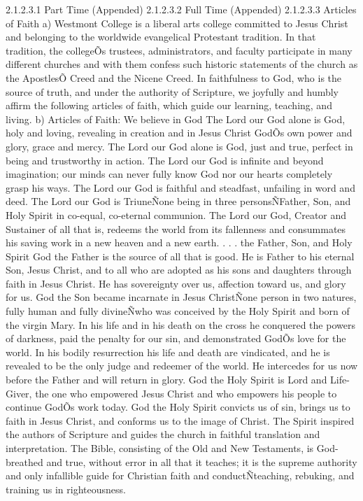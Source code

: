 \documentclass[letterpaper, 11pt]{article}
\begin{document}
				2.1.2.3.1 Part Time (Appended)
				2.1.2.3.2 Full Time (Appended)
				2.1.2.3.3 Articles of Faith
				a) Westmont College is a liberal arts college committed to Jesus Christ and belonging to the worldwide evangelical Protestant tradition.  In that tradition, the collegeÕs trustees, administrators, and faculty participate in many different churches and with them confess such historic statements of the church as the ApostlesÕ Creed and the Nicene Creed. In faithfulness to God, who is the source of truth, and under the authority of Scripture, we joyfully and humbly affirm the following articles of faith, which guide our learning, teaching, and living.
				b) Articles of Faith:
				We believe in God
				The Lord our God alone is God, holy and loving, revealing in creation and in Jesus Christ GodÕs own power and glory, grace and mercy. The Lord our God alone is God, just and true, perfect in being and trustworthy in action.
				The Lord our God is infinite and beyond imagination; our minds can never fully know God nor our hearts completely grasp his ways. The Lord our God is faithful and steadfast, unfailing in word and deed.
				The Lord our God is TriuneÑone being in three personsÑFather, Son, and Holy Spirit in co-equal, co-eternal communion. The Lord our God, Creator and Sustainer of all that is, redeems the world from its fallenness and consummates his saving work in a new heaven and a new earth.
				. . . the Father, Son, and Holy Spirit
				God the Father is the source of all that is good. He is Father to his eternal Son, Jesus Christ, and to all who are adopted as his sons and daughters through faith in Jesus Christ. He has sovereignty over us, affection toward us, and glory for us.
				God the Son became incarnate in Jesus ChristÑone person in two natures, fully human and fully divineÑwho was conceived by the Holy Spirit and born of the virgin Mary. In his life and in his death on the cross he conquered the powers of darkness, paid the penalty for our sin, and demonstrated GodÕs love for the world.  In his bodily resurrection his life and death are vindicated, and he is revealed to be the only judge and redeemer of the world. He intercedes for us now before the Father and will return in glory.
				God the Holy Spirit is Lord and Life-Giver, the one who empowered Jesus Christ and who empowers his people to continue GodÕs work today. God the Holy Spirit convicts us of sin, brings us to faith in Jesus Christ, and conforms us to the image of Christ. The Spirit inspired the authors of  Scripture and guides the church in faithful translation and interpretation. The Bible, consisting of the Old and New Testaments, is God-breathed and true, without error in all that it teaches; it is the supreme authority and only infallible guide for Christian faith and conductÑteaching, rebuking, and training us in righteousness.
\end{document}
